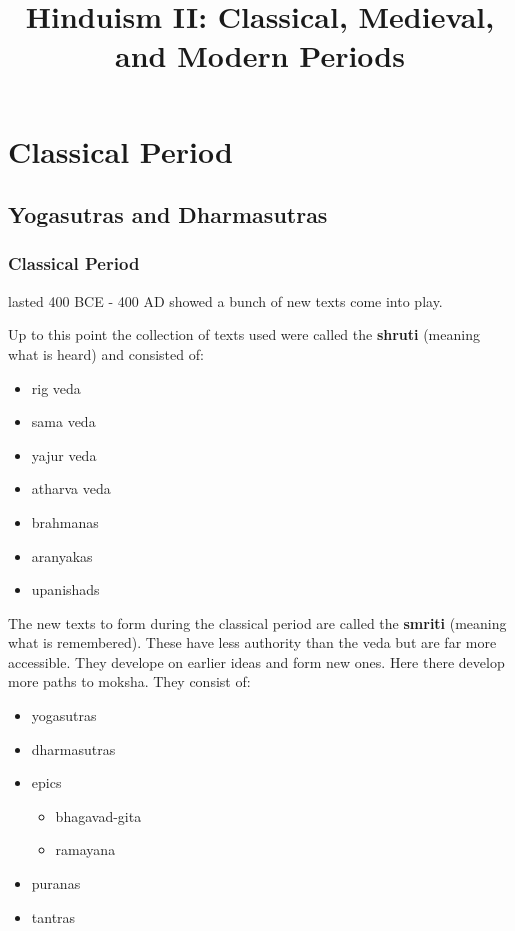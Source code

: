\documentclass{article}
\begin{document}
\title{Hinduism II: Classical, Medieval, and Modern Periods}
\maketitle
\section*{Classical Period}
\label{sec:classical_period}

\subsection*{Yogasutras and Dharmasutras}
\label{sec:yogasutras_and_dharmasutras}
\subsubsection*{Classical Period}
\label{par:classical_period}
lasted 400 BCE - 400 AD showed a bunch of new texts come into play.

Up to this point the collection of texts used were called the \textbf{shruti} (meaning what is heard) and consisted of:
\begin{itemize}
	\item rig veda
	\item sama veda
	\item yajur veda
	\item atharva veda
	\item brahmanas
	\item aranyakas
	\item upanishads
\end{itemize}

The new texts to form during the classical period are called the \textbf{smriti} (meaning what is remembered). These have less authority than the veda but are far more accessible. They develope on earlier ideas and form new ones. Here there develop more paths to moksha. They consist of:
\begin{itemize}
	\item yogasutras
	\item dharmasutras
	\item epics
	\begin{itemize}
		\item bhagavad-gita
		\item ramayana
	\end{itemize}
	\item puranas
	\item tantras
\end{itemize}
\end{document}
